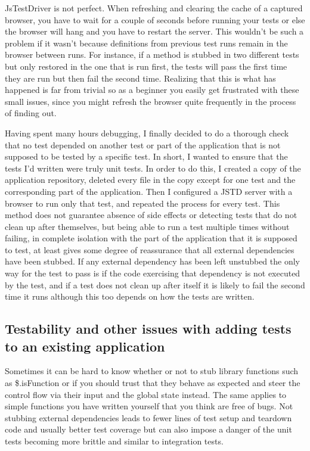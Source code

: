 \documentclass[11pt]{article}
\begin{document}
JsTestDriver is not perfect. When refreshing and clearing the cache of a captured browser, you have to wait for a couple of seconds before running your tests or else the browser will hang and you have to restart the server. This wouldn't be such a problem if it wasn't because definitions from previous test runs remain in the browser between runs. For instance, if a method is stubbed in two different tests but only restored in the one that is run first, the tests will pass the first time they are run but then fail the second time. Realizing that this is what has happened is far from trivial so as a beginner you easily get frustrated with these small issues, since you might refresh the browser quite frequently in the process of finding out.

Having spent many hours debugging, I finally decided to do a thorough check that no test depended on another test or part of the application that is not supposed to be tested by a specific test. In short, I wanted to ensure that the tests I'd written were truly unit tests. In order to do this, I created a copy of the application repository, deleted every file in the copy except for one test and the corresponding part of the application. Then I configured a JSTD server with a browser to run only that test, and repeated the process for every test. This method does not guarantee absence of side effects or detecting tests that do not clean up after themselves, but being able to run a test multiple times without failing, in complete isolation with the part of the application that it is supposed to test, at least gives some degree of reassurance that all external dependencies have been stubbed. If any external dependency has been left unstubbed the only way for the test to pass is if the code exercising that dependency is not executed by the test, and if a test does not clean up after itself it is likely to fail the second time it runs although this too depends on how the tests are written.

\subsection{Testability and other issues with adding tests to an existing application}

Sometimes it can be hard to know whether or not to stub library functions such as \$.isFunction or if you should trust that they behave as expected and steer the control flow via their input and the global state instead. The same applies to simple functions you have written yourself that you think are free of bugs. Not stubbing external dependencies leads to fewer lines of test setup and teardown code and usually better test coverage but can also impose a danger of the unit tests becoming more brittle and similar to integration tests.
\end{document}
